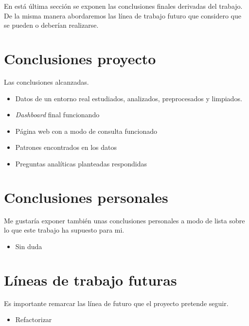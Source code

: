 
En está última sección se exponen las conclusiones finales derivadas del trabajo. De la misma manera abordaremos las línea de trabajo futuro que considero que se pueden o deberían realizarse.


\section{Conclusiones proyecto}\label{conclusiones_proyecto}
Las conclusiones alcanzadas.
\begin{itemize}
	\item Datos de un entorno real estudiados, analizados, preprocesados y limpiados.
	\item \textit{Dashboard} final funcionando
	\item Página web con a modo de consulta  funcionado
	\item Patrones encontrados en los datos
	\item Preguntas analíticas planteadas respondidas
\end{itemize}

\section{Conclusiones personales}\label{conclusiones_personales}
Me gustaría exponer también unas conclusiones personales a modo de lista sobre lo que este trabajo ha supuesto para mi.  

\begin{itemize}
	\item Sin duda 
\end{itemize}

\section{Líneas de trabajo futuras}\label{lineas_futuras}
Es importante remarcar las línea de futuro que el proyecto pretende seguir.

\begin{itemize}
	\item Refactorizar 
\end{itemize}
